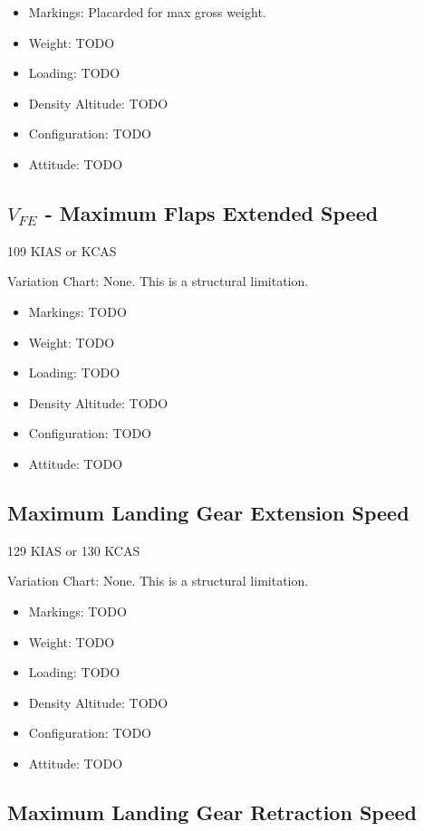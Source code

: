 \begin{itemize}
\item Markings: Placarded for max gross weight.
\item Weight: TODO
\item Loading: TODO
\item Density Altitude: TODO
\item Configuration: TODO
\item Attitude: TODO
\end{itemize}

\subsection{$V_{FE}$ - Maximum Flaps Extended Speed}

109 KIAS or KCAS

Variation Chart: None. This is a structural limitation.

\begin{itemize}
\item Markings: TODO
\item Weight: TODO
\item Loading: TODO
\item Density Altitude: TODO
\item Configuration: TODO
\item Attitude: TODO
\end{itemize}

\subsection{Maximum Landing Gear Extension Speed}

129 KIAS or 130 KCAS

Variation Chart: None. This is a structural limitation.

\begin{itemize}
\item Markings: TODO
\item Weight: TODO
\item Loading: TODO
\item Density Altitude: TODO
\item Configuration: TODO
\item Attitude: TODO
\end{itemize}

\subsection{Maximum Landing Gear Retraction Speed}

